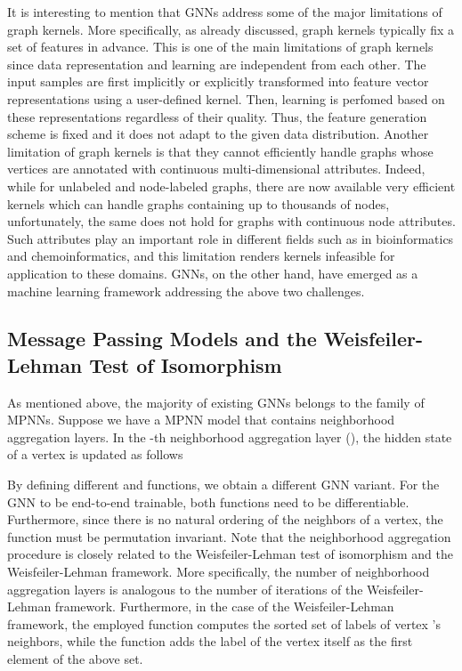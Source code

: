 \documentclass[twoside,11pt]{article}
\begin{document}
It is interesting to mention that GNNs address some of the major limitations of graph kernels.
More specifically, as already discussed, graph kernels typically fix a set of features in advance.
This is one of the main limitations of graph kernels since data representation and learning are independent from each other.
The input samples are first implicitly or explicitly transformed into feature vector representations using a user-defined kernel.
Then, learning is perfomed based on these representations regardless of their quality.
Thus, the feature generation scheme is fixed and it does not adapt to the given data distribution.
Another limitation of graph kernels is that they cannot efficiently handle graphs whose vertices are annotated with continuous multi-dimensional attributes.
Indeed, while for unlabeled and node-labeled graphs, there are now available very efficient kernels which can handle graphs containing up to thousands of nodes, unfortunately, the same does not hold for graphs with continuous node attributes. 
Such attributes play an important role in different fields such as in bioinformatics and chemoinformatics, and this limitation renders kernels infeasible for application to these domains.
GNNs, on the other hand, have emerged as a machine learning framework addressing the above two challenges.

\subsection{Message Passing Models and the Weisfeiler-Lehman Test of Isomorphism}
As mentioned above, the majority of existing GNNs belongs to the family of MPNNs.
Suppose we have a MPNN model that contains  neighborhood aggregation layers.
In the -th neighborhood aggregation layer (), the hidden state  of a vertex  is updated as follows

By defining different  and  functions, we obtain a different GNN variant.
For the GNN to be end-to-end trainable, both functions need to be differentiable.
Furthermore, since there is no natural ordering of the neighbors of a vertex, the  function must be permutation invariant.
Note that the neighborhood aggregation procedure is closely related to the Weisfeiler-Lehman test of isomorphism and the Weisfeiler-Lehman framework.
More specifically, the number of neighborhood aggregation layers is analogous to the number of iterations of the Weisfeiler-Lehman framework.
Furthermore, in the case of the Weisfeiler-Lehman framework, the employed  function computes the sorted set of labels of vertex 's neighbors, while the  function adds the label of the vertex  itself as the first element of the above set.
\end{document}
